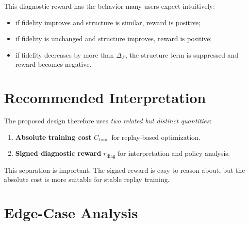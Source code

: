 \documentclass[11pt]{article}
\begin{document}
This diagnostic reward has the behavior many users expect intuitively:

\begin{itemize}[leftmargin=*]
\item if fidelity improves and structure is similar, reward is positive;
\item if fidelity is unchanged and structure improves, reward is positive;
\item if fidelity decreases by more than $\Delta_F$, the structure term is suppressed and reward becomes negative.
\end{itemize}

\section{Recommended Interpretation}

The proposed design therefore uses \emph{two related but distinct quantities}:

\begin{enumerate}[leftmargin=*]
\item \textbf{Absolute training cost} $C_{\mathrm{train}}$ for replay-based optimization.
\item \textbf{Signed diagnostic reward} $r_{\mathrm{diag}}$ for interpretation and policy analysis.
\end{enumerate}

This separation is important.
The signed reward is easy to reason about, but the absolute cost is more suitable for stable replay training.

\section{Edge-Case Analysis}
\end{document}
